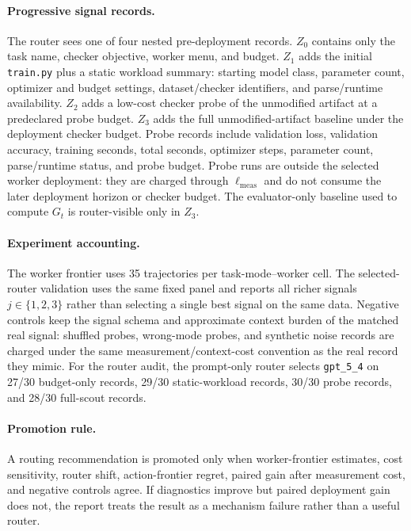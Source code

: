 \documentclass{article}
\begin{document}
\paragraph{Progressive signal records.}
The router sees one of four nested pre-deployment records.
\(Z_0\) contains only the task name, checker objective, worker menu, and budget.
\(Z_1\) adds the initial \texttt{train.py} plus a static workload summary: starting model class, parameter count, optimizer and budget settings, dataset/checker identifiers, and parse/runtime availability.
\(Z_2\) adds a low-cost checker probe of the unmodified artifact at a predeclared probe budget.
\(Z_3\) adds the full unmodified-artifact baseline under the deployment checker budget.
Probe records include validation loss, validation accuracy, training seconds, total seconds, optimizer steps, parameter count, parse/runtime status, and probe budget.
Probe runs are outside the selected worker deployment: they are charged through \(\ell_{\mathrm{meas}}\) and do not consume the later deployment horizon or checker budget.
The evaluator-only baseline used to compute \(G_t\) is router-visible only in \(Z_3\).

\paragraph{Experiment accounting.}
The worker frontier uses 35 trajectories per task-mode--worker cell.
The selected-router validation uses the same fixed panel and reports all richer signals \(j\in\{1,2,3\}\) rather than selecting a single best signal on the same data.
Negative controls keep the signal schema and approximate context burden of the matched real signal: shuffled probes, wrong-mode probes, and synthetic noise records are charged under the same measurement/context-cost convention as the real record they mimic.
For the router audit, the prompt-only router selects \texttt{gpt\_5\_4} on 27/30 budget-only records, 29/30 static-workload records, 30/30 probe records, and 28/30 full-scout records.

\paragraph{Promotion rule.}
A routing recommendation is promoted only when worker-frontier estimates, cost sensitivity, router shift, action-frontier regret, paired gain after measurement cost, and negative controls agree.
If diagnostics improve but paired deployment gain does not, the report treats the result as a mechanism failure rather than a useful router.
\end{document}
